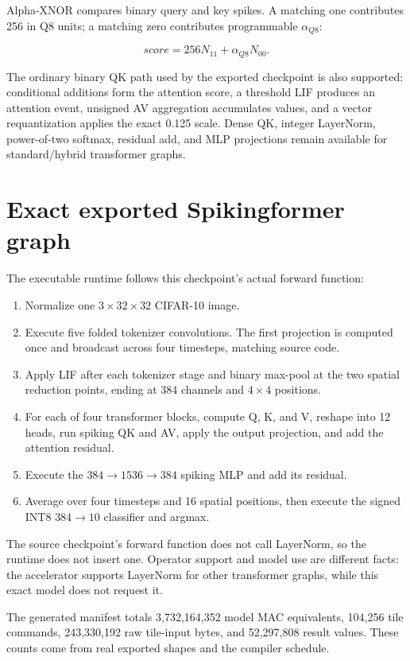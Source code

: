 \documentclass[10pt]{article}
\begin{document}
Alpha-XNOR compares binary query and key spikes. A matching one contributes
256 in Q8 units; a matching zero contributes programmable $\alpha_{Q8}$:

\[
  score=256N_{11}+\alpha_{Q8}N_{00}.
\]

The ordinary binary QK path used by the exported checkpoint is also supported:
conditional additions form the attention score, a threshold LIF produces an
attention event, unsigned AV aggregation accumulates values, and a vector
requantization applies the exact 0.125 scale. Dense QK, integer LayerNorm,
power-of-two softmax, residual add, and MLP projections remain available for
standard/hybrid transformer graphs.

\section{Exact exported Spikingformer graph}

The executable runtime follows this checkpoint's actual forward function:

\begin{enumerate}
  \item Normalize one $3\times32\times32$ CIFAR-10 image.
  \item Execute five folded tokenizer convolutions. The first projection is
  computed once and broadcast across four timesteps, matching source code.
  \item Apply LIF after each tokenizer stage and binary max-pool at the two
  spatial reduction points, ending at 384 channels and $4\times4$ positions.
  \item For each of four transformer blocks, compute Q, K, and V, reshape into
  12 heads, run spiking QK and AV, apply the output projection, and add the
  attention residual.
  \item Execute the $384\rightarrow1536\rightarrow384$ spiking MLP and add its
  residual.
  \item Average over four timesteps and 16 spatial positions, then execute the
  signed INT8 $384\rightarrow10$ classifier and argmax.
\end{enumerate}

The source checkpoint's forward function does not call LayerNorm, so the
runtime does not insert one. Operator support and model use are different
facts: the accelerator supports LayerNorm for other transformer graphs, while
this exact model does not request it.

The generated manifest totals 3,732,164,352 model MAC equivalents, 104,256 tile
commands, 243,330,192 raw tile-input bytes, and 52,297,808 result values. These
counts come from real exported shapes and the compiler schedule.
\end{document}
